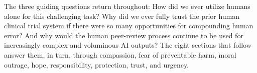 The three guiding questions return throughout: How did we ever utilize humans
alone for this challenging task? Why did we ever fully trust the prior human
clinical trial system if there were so many opportunities for compounding human
error? And why would the human peer-review process continue to be used for
increasingly complex and voluminous AI outputs? The eight sections that follow
answer them, in turn, through compassion, fear of preventable harm, moral
outrage, hope, responsibility, protection, trust, and urgency.
